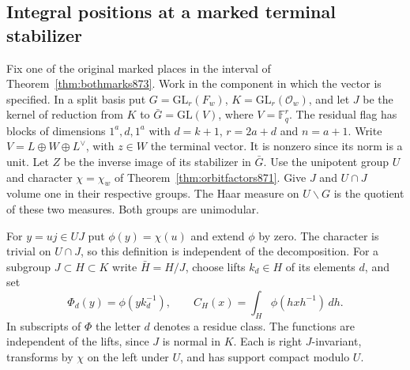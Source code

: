 \documentclass[a4paper,11pt]{article}
\theoremstyle{definition}
\theoremstyle{remark}
\numberwithin{equation}{section}
\begin{document}
\clearpage
\subsection{Integral positions at a marked terminal stabilizer}
\label{sec:integralmass881}

Fix one of the original marked places in the interval of
Theorem~\ref{thm:bothmarks873}. Work in the component in which the
vector is specified. In a split basis put \(G=\mathrm{GL}_r(F_w)\),
\(K=\mathrm{GL}_r(\mathcal O_w)\), and let \(J\) be the kernel of
reduction from \(K\) to \(\bar G=\mathrm{GL}(V)\), where
\(V=\mathbb F_q^r\). The residual flag has blocks of dimensions
\(1^a,d,1^a\) with \(d=k+1\), \(r=2a+d\) and \(n=a+1\).
Write \(V=L\oplus W\oplus L^\vee\), with \(z\in W\) the terminal
vector. It is nonzero since its norm is a unit. Let \(Z\) be the
inverse image of its stabilizer in \(\bar G\). Use the unipotent
group \(U\) and character \(\chi=\chi_w\) of
Theorem~\ref{thm:orbitfactors871}. Give \(J\) and \(U\cap J\)
volume one in their respective groups. The Haar measure on
\(U\backslash G\) is the quotient of these two measures. Both
groups are unimodular.

For \(y=u j\in UJ\) put \(\phi(y)=\chi(u)\) and extend \(\phi\)
by zero. The character is trivial on \(U\cap J\), so this
definition is independent of the decomposition. For a subgroup
\(J\subset H\subset K\) write \(\bar H=H/J\), choose lifts
\(k_d\in H\) of its elements \(d\), and set
\[
 \Phi_d(y)=\phi(y k_d^{-1}),\qquad
 C_H(x)=\int_H\phi(hxh^{-1})\,dh .
\]
In subscripts of \(\Phi\) the letter \(d\) denotes a residue class.
The functions are independent of the lifts, since \(J\) is normal
in \(K\). Each is right \(J\)-invariant, transforms by \(\chi\)
on the left under \(U\), and has support compact modulo \(U\).
\end{document}
